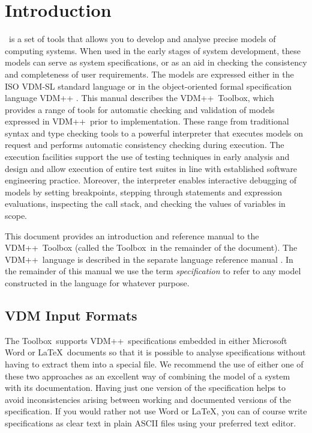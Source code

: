 \documentclass[\pformat,12pt]{article}
\newcommand{\vdmslpp}{VDM++}
\newcommand{\Toolbox}{Toolbox}
\begin{document}
\vdmtoolsmanualscsk{VDMTools User Manual (\vdmslpp)}
       {}

\section{Introduction} \label{introduction}


\VDMTools\ is a set of tools that allows you to develop and analyse
precise models of computing systems. When used in the early stages of
system development, these models can serve as system specifications,
or as an aid in checking the consistency and completeness of user
requirements. The models are expressed either in the ISO VDM-SL
standard language \cite{ISOVDM96} or in the
object-oriented formal specification language VDM++
\cite{LangManPP-SCSK,Fitzgerald&05}. This manual describes the \vdmslpp\ Toolbox, which
provides a range of tools for automatic checking and validation of
models expressed in \vdmslpp\ 
prior to implementation. These range from traditional syntax and type
checking tools to a powerful interpreter that executes models on
request and performs automatic consistency checking during execution.
The execution facilities support the use of testing techniques in
early analysis and design and allow execution of entire test suites in
line with established software engineering practice.  Moreover, the
interpreter enables interactive debugging of models by setting
breakpoints, stepping through statements and expression evaluations,
inspecting the call stack, and checking the values of variables in
scope.

This document provides an introduction and reference manual to the
\vdmslpp\ Toolbox (called the \Toolbox\ in the remainder of the
document). The \vdmslpp\ language is described in the separate
language reference manual
. In the
remainder of this manual we use the term {\em specification\/} to
refer to any model constructed in the language for whatever purpose.


\subsection*{VDM Input Formats}

The \Toolbox\ supports \vdmslpp\ specifications embedded in either
Microsoft Word or \LaTeX\ documents so that it is possible to analyse
specifications without having to extract them into a special file. We
recommend the use of either one of these two approaches as an
excellent way of combining the model of a system with its
documentation. Having just one version of the specification helps to
avoid inconsistencies arising between working and documented versions
of the specification. If you would rather not use Word or \LaTeX, you
can of course write specifications as clear text in plain ASCII files
using your preferred text editor.
\end{document}
